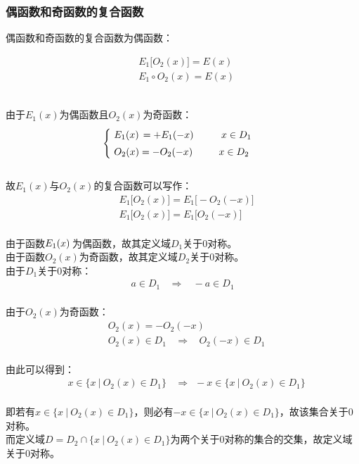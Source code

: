 \documentclass[UTF8]{ctexart}
\begin{document}
\newpage

\subsubsection{偶函数和奇函数的复合函数}
    \setcounter{equation}{0}
    偶函数和奇函数的复合函数为偶函数：
    \begin{large}
        \begin{align*}
            &E_1\big[O_2(x)\big]=E(x)\\[3mm]
            &E_1\circ O_2(x)=E(x)
        \end{align*}
    \end{large}\\
    由于$E_1(x)$为偶函数且$O_2(x)$为奇函数：
    \begin{align}
        \begin{cases}
            ~E_1(x)\hspace{1.5pt}=+E_1(-x)\hspace{1.5pt}~~~~~~~~x\in D_1\\[1mm]
            ~O_2(x)=-O_2(-x)~~~~~~~~x\in D_2
        \end{cases}
    \end{align}\\[3mm]
    故$E_1(x)$与$O_2(x)$的复合函数可以写作：
    \begin{align}
        &E_1\big[O_2(x)\big]=E_1\big[-O_2(-x)\big]\\[5mm]
        &E_1\big[O_2(x)\big]=E_1\big[O_2(-x)\big]
    \end{align}\\
    由于函数$E_1(x)\hspace{1.5pt}$为偶函数，故其定义域$D_1$关于$0$对称。\\[3mm]
    由于函数$O_2(x)$为奇函数，故其定义域$D_2$关于$0$对称。\\[3mm]
    由于$D_1$关于$0$对称：
    \begin{align}
        a\in D_1~~~~\Longrightarrow~~~~-a\in D_1
    \end{align}\\
    由于$O_2(x)$为奇函数：
    \begin{align}
        &O_2(x)=-O_2(-x)\\[5mm]
        &O_2(x)\in D_1~~~~\Longrightarrow~~~~O_2(-x)\in D_1
    \end{align}\\
    由此可以得到：
    \begin{align}
        &x\in\big\{x~|~O_2(x)\in D_1\big\}~~~~\Longrightarrow~~-x\in\big\{x~|~O_2(x)\in D_1\big\}
    \end{align}\\
    即若有$x\in\big\{x~|~O_2(x)\in D_1\big\}$，则必有$-x\in\big\{x~|~O_2(x)\in D_1\big\}$，故该集合关于$0$对称。\\[3mm]
    而定义域$D=D_2\cap\big\{x~|~O_2(x)\in D_1\big\}$为两个关于$0$对称的集合的交集，故定义域关于$0$对称。
\end{document}
